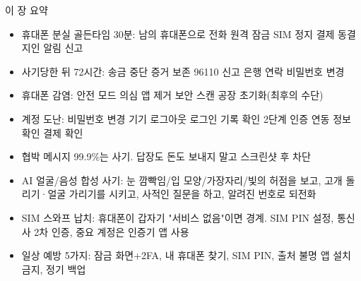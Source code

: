 \begin{tcbsummary}{이 장 요약}
\begin{itemize}
  \item 휴대폰 분실 골든타임 30분: 남의 휴대폰으로 전화 원격 잠금 SIM 정지 결제 동결 지인 알림 신고
  \item 사기당한 뒤 72시간: 송금 중단 증거 보존 96110 신고 은행 연락 비밀번호 변경
  \item 휴대폰 감염: 안전 모드 의심 앱 제거 보안 스캔 공장 초기화(최후의 수단)
  \item 계정 도난: 비밀번호 변경 기기 로그아웃 로그인 기록 확인 2단계 인증 연동 정보 확인 결제 확인
  \item 협박 메시지 99.9\%는 사기. 답장도 돈도 보내지 말고 스크린샷 후 차단
  \item AI 얼굴/음성 합성 사기: 눈 깜빡임/입 모양/가장자리/빛의 허점을 보고, 고개 돌리기·얼굴 가리기를 시키고, 사적인 질문을 하고, 알려진 번호로 되전화
  \item SIM 스와프 납치: 휴대폰이 갑자기 "서비스 없음"이면 경계. SIM PIN 설정, 통신사 2차 인증, 중요 계정은 인증기 앱 사용
  \item 일상 예방 5가지: 잠금 화면+2FA, 내 휴대폰 찾기, SIM PIN, 출처 불명 앱 설치 금지, 정기 백업
\end{itemize}

\end{tcbsummary}
